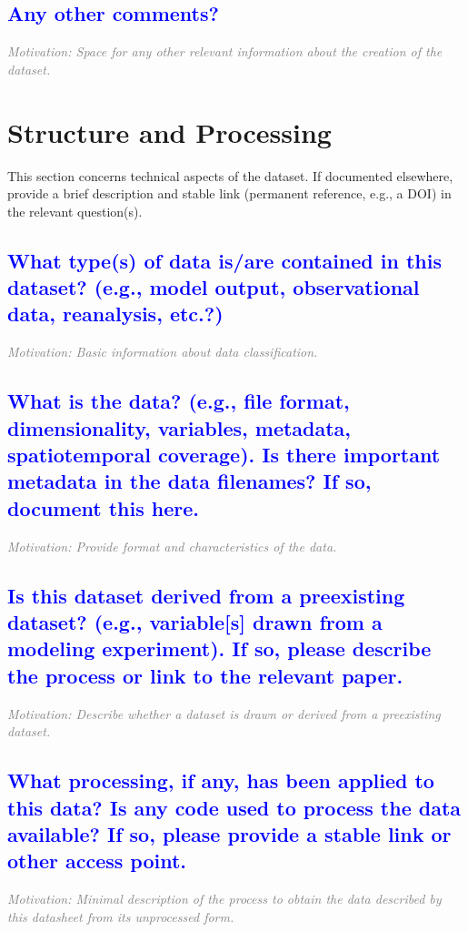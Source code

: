 \documentclass[letterpaper, 10 pt, transmag]{IEEEtran}
\begin{document}
\textcolor{blue}{\subsection{Any other comments?}}
\textcolor{gray}{\textit{Motivation: Space for any other relevant information about the creation of the dataset.}}  

\vspace{10mm}

\section{Structure and Processing}
This section concerns technical aspects of the dataset. If documented elsewhere, provide a brief description and stable link (permanent reference, e.g., a DOI) in the relevant question(s).

\textcolor{blue}{\subsection{What type(s) of data is/are contained in this dataset? (e.g., model output, observational data, reanalysis, etc.?)}}
\textcolor{gray}{\textit{Motivation: Basic information about data classification.}}

\textcolor{blue}{\subsection{What is the data? (e.g., file format, dimensionality, variables, metadata, spatiotemporal coverage). Is there important metadata in the data filenames? If so, document this here.}}
\textcolor{gray}{\textit{Motivation: Provide format and characteristics of the data.}}

\textcolor{blue}{\subsection{Is this dataset derived from a preexisting dataset? (e.g., variable[s] drawn from a modeling experiment). If so, please describe the process or link to the relevant paper.}} 
\textcolor{gray}{\textit{Motivation: Describe whether a dataset is drawn or derived from a preexisting dataset.}}

\textcolor{blue}{\subsection{What processing, if any, has been applied to this data? Is any code used to process the data available? If so, please provide a stable link or other access point.}}
\textcolor{gray}{\textit{Motivation: Minimal description of the process to obtain the data described by this datasheet from its unprocessed form.}}
\end{document}
